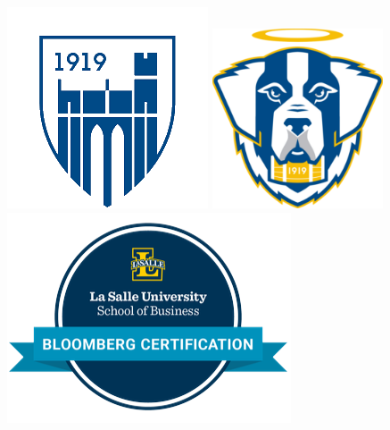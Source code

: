 \documentclass[letterpaper,]{article}
\begin{document}
\begin{center} 
    \href{https://www.emmanuel.edu/academics/academic-study/schools/school-business-management/undergraduate-programs/economics/finance}{\includegraphics[scale=0.18]{emmanuel_badge_transparent.png}}
    \href{https://www.goecsaints.com/sports/m-volley/2023-24/roster?fbclid=IwZXh0bgNhZW0CMTAAAR1BNVivBPFXwbOnF0Or9-soHdK9oZpkIlVMOkQCKcvJAdITIKqFqxbJQVs_aem_AWWyeZeu-n9J8rkD5-lNwZaIXUJtoKfKY4K3m-vu2l1DcCKM-mdDvC9JsHp7QImKCABa0u0L1RcDO4bvdM66DGxy}{\includegraphics[scale=0.18]{Emmanuel_mascot_logo.png}}
    \href{https://portal.bloombergforeducation.com/certificates/aFF9RiF8vzATYCHTn2T9nDSd?fbclid=IwZXh0bgNhZW0CMTAAAR3-ujvQXxlrKKokvqcgeqzs4V5ppb-BhxnKoYus3PhcME4UJuSOAG2uvWk_aem_AZUypaVosUCKcX8Ps1ObZDUmYhYC6dA8jnRW6RfXXnHdNkYlZC0t_Etc4ewy5XklgO_EDGN7VuiNMd-jd7LSAhzj}{\includegraphics[scale=0.15]{BCM_badge.png}}
\end{center}
\end{document}
